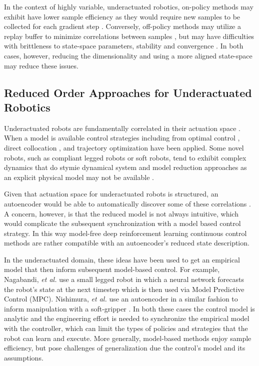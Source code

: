 \documentclass[letterpaper, 10 pt, conference]{ieeeconf}
\begin{document}
In the context of highly variable, underactuated robotics, on-policy methods may exhibit have lower sample efficiency as they would require new samples to be collected for each gradient step \cite{SAC}.   Conversely, off-policy methods may utilize a replay buffer to minimize correlations between samples \cite{DDPG}, but may have difficulties with brittleness to state-space parameters, stability and convergence \cite{bhatnagar2009convergent}.  In both cases, however, reducing the dimensionality and using a more aligned state-space may reduce these issues. 


\subsection{Reduced Order Approaches for Underactuated Robotics}

Underactuated robots are fundamentally correlated in their actuation space  \cite{tedrake2009underactuated}.
When a model is available control strategies including from optimal control \cite{betts2010practical}, direct collocation \cite{von1993numerical}, and trajectory optimization \cite{kalakrishnan2011stomp} have been applied.
Some novel robots, such as compliant legged robots or soft robots, tend to exhibit complex dynamics that do stymie dynamical system and model reduction approaches as an explicit physical model may not be available \cite{nakajima2015information}.

Given that actuation space for underactuated robots is structured, an autoencoder would be able to automatically discover some of these correlations \cite{AE_hinton2006reducing, ngsparse}.
A concern, however, is that the reduced model is not always intuitive, which would complicate the subsequent synchronization with a model based control strategy.
In this way model-free deep reinforcement learning continuous control methods are rather compatible with an autoencoder's reduced state description.


In the underactuated domain, these ideas have been used to get an empirical model that then inform subsequent model-based control.  For example, Nagabandi, \emph{et al.} \cite{nagabandi2018learning} use a small legged robot in which a neural network forecasts the robot's state at the next timestep which is then used via Model Predictive Control (MPC).  Nishimura, \emph{et al.} use an autoencoder in a similar fashion to inform manipulation with a soft-gripper \cite{nishimura2017thin}.  In both these cases the control model is analytic and the engineering effort is needed to synchronize the empirical model with the controller, which can limit the types of policies and strategies that the robot can learn and execute.  
More generally, model-based methods enjoy sample efficiency, but pose challenges of generalization due the control's model and its assumptions.  
\end{document}
